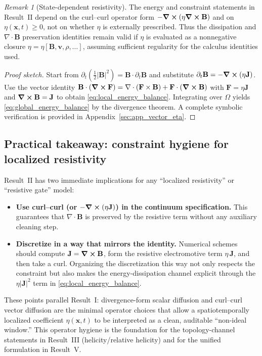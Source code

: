 \documentclass[11pt]{article}
\theoremstyle{plain}
\theoremstyle{definition}
\theoremstyle{remark}
\newtheorem{remark}{Remark}
\newcommand{\diver}{\nabla\cdot}
\newcommand{\B}{\mathbf{B}}
\newcommand{\J}{\mathbf{J}}
\newcommand{\vfield}{\mathbf{v}}
\begin{document}
\begin{remark}[State-dependent resistivity]\label{rem:state_dependent_eta_vector}
The energy and constraint statements in Result~II depend on the curl--curl operator form $-\curl(\eta\curl\B)$ and on $\eta(\mathbf{x},t)\ge 0$, not on whether $\eta$ is externally prescribed. Thus the dissipation and $\diver\B$ preservation identities remain valid if $\eta$ is evaluated as a nonnegative closure $\eta=\eta[\B,\vfield,\rho,\ldots]$, assuming sufficient regularity for the calculus identities used.
\end{remark}

\begin{proof}[Proof sketch]
Start from $\partial_t(\tfrac12|\B|^2)=\B\cdot\partial_t\B$ and substitute
$\partial_t\B=-\curl(\eta\J)$. Use the vector identity
$\B\cdot(\curl \mathbf{F})=\diver(\mathbf{F}\times\B)+\mathbf{F}\cdot(\curl\B)$ with
$\mathbf{F}=\eta\J$ and $\curl\B=\J$ to obtain \eqref{eq:local_energy_balance}. Integrating over
$\Omega$ yields \eqref{eq:global_energy_balance} by the divergence theorem. A complete symbolic
verification is provided in Appendix~\ref{sec:app_vector_eta}. %
\end{proof}

\subsection{Practical takeaway: constraint hygiene for localized resistivity}\label{sec:result_vector_takeaway}
Result~II has two immediate implications for any ``localized resistivity'' or ``resistive gate'' model:

\begin{itemize}[leftmargin=*]
  \item \textbf{Use curl--curl (or $-\curl(\eta\J)$) in the continuum specification.}
  This guarantees that $\diver\B$ is preserved by the resistive term without any auxiliary cleaning step.

  \item \textbf{Discretize in a way that mirrors the identity.}
  Numerical schemes should compute $\J=\curl\B$, form the resistive electromotive term
  $\eta\,\J$, and then take a curl. Organizing the discretization this way not only respects the
  constraint but also makes the energy-dissipation channel explicit through the $\eta|\J|^2$ term in
  \eqref{eq:local_energy_balance}.
\end{itemize}

These points parallel Result~I: divergence-form scalar diffusion and curl--curl vector diffusion are the
minimal operator choices that allow a spatiotemporally localized coefficient $\eta(\mathbf{x},t)$ to be
interpreted as a clean, auditable ``non-ideal window.'' This operator hygiene is the foundation for the
topology-channel statements in Result~III (helicity/relative helicity) and for the unified formulation in
Result~V.
\end{document}
